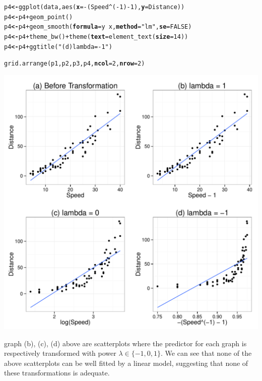 \documentclass[12pt,oneside,a4paper]{article}\usepackage[]{graphicx}\usepackage[]{xcolor}
\makeatletter
\newcommand{\hlnum}[1]{\textcolor[rgb]{0,0,0}{#1}}%
\newcommand{\hlstr}[1]{\textcolor[rgb]{0,0,1}{#1}}%
\newcommand{\hlopt}[1]{\textcolor[rgb]{0,0,0}{#1}}%
\newcommand{\hlstd}[1]{\textcolor[rgb]{0,0,0}{#1}}%
\newcommand{\hlkwb}[1]{\textcolor[rgb]{0.498,0,0.333}{\textbf{#1}}}%
\newcommand{\hlkwc}[1]{\textcolor[rgb]{0.498,0,0.333}{\textbf{#1}}}%
\newcommand{\hlkwd}[1]{\textcolor[rgb]{0,0,0}{#1}}%
\newenvironment{kframe}{%
 \def\at@end@of@kframe{}%
 \ifinner\ifhmode%
  \def\at@end@of@kframe{\end{minipage}}%
  \begin{minipage}{\columnwidth}%
 \fi\fi%
 \def\FrameCommand##1{\hskip\@totalleftmargin \hskip-\fboxsep
 \colorbox{shadecolor}{##1}\hskip-\fboxsep
     \hskip-\linewidth \hskip-\@totalleftmargin \hskip\columnwidth}%
 \MakeFramed {\advance\hsize-\width
   \@totalleftmargin\z@ \linewidth\hsize
   \@setminipage}}%
 {\par\unskip\endMakeFramed%
 \at@end@of@kframe}
\newenvironment{knitrout}{}{} %
\makeatother
\begin{document}
\begin{knitrout}
\begin{kframe}
\begin{alltt}
\hlstd{p4} \hlkwb{<-} \hlkwd{ggplot}\hlstd{(data,} \hlkwd{aes}\hlstd{(}\hlkwc{x} \hlstd{=} \hlopt{-}\hlstd{(Speed} \hlopt{^} \hlstd{(}\hlopt{-}\hlnum{1}\hlstd{)} \hlopt{-} \hlnum{1}\hlstd{),} \hlkwc{y} \hlstd{= Distance))}
\hlstd{p4} \hlkwb{<-} \hlstd{p4} \hlopt{+} \hlkwd{geom_point}\hlstd{()}
\hlstd{p4} \hlkwb{<-} \hlstd{p4} \hlopt{+} \hlkwd{geom_smooth}\hlstd{(}\hlkwc{formula} \hlstd{= y} \hlopt{~} \hlstd{x,} \hlkwc{method} \hlstd{=} \hlstr{"lm"}\hlstd{,} \hlkwc{se} \hlstd{=} \hlnum{FALSE}\hlstd{)}
\hlstd{p4} \hlkwb{<-} \hlstd{p4} \hlopt{+} \hlkwd{theme_bw}\hlstd{()} \hlopt{+} \hlkwd{theme}\hlstd{(}\hlkwc{text} \hlstd{=} \hlkwd{element_text}\hlstd{(}\hlkwc{size} \hlstd{=} \hlnum{14}\hlstd{))}
\hlstd{p4} \hlkwb{<-} \hlstd{p4} \hlopt{+} \hlkwd{ggtitle}\hlstd{(}\hlstr{"(d) lambda = -1"}\hlstd{)}

\hlkwd{grid.arrange}\hlstd{(p1, p2, p3, p4,} \hlkwc{ncol} \hlstd{=} \hlnum{2}\hlstd{,} \hlkwc{nrow} \hlstd{=} \hlnum{2}\hlstd{)}
\end{alltt}
\end{kframe}

{\centering \includegraphics[width=.9\linewidth]{figure/p822} 

}



\end{knitrout}

graph (b), (c), (d) above are scatterplots where the predictor for each graph is respectively transformed with power $\lambda \in \{-1,0,1\}$. We can see that none of the above scatterplots can be well fitted by a linear model, suggesting that none of these transformations is adequate.
\end{document}
